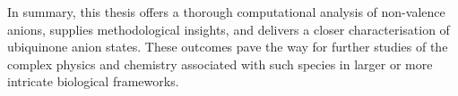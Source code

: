 In summary, this thesis offers a thorough computational analysis of non-valence anions, supplies methodological insights, and delivers a closer characterisation of ubiquinone anion states. These outcomes pave the way for further studies of the complex physics and chemistry associated with such species in larger or more intricate biological frameworks.


\cleardoublepage

